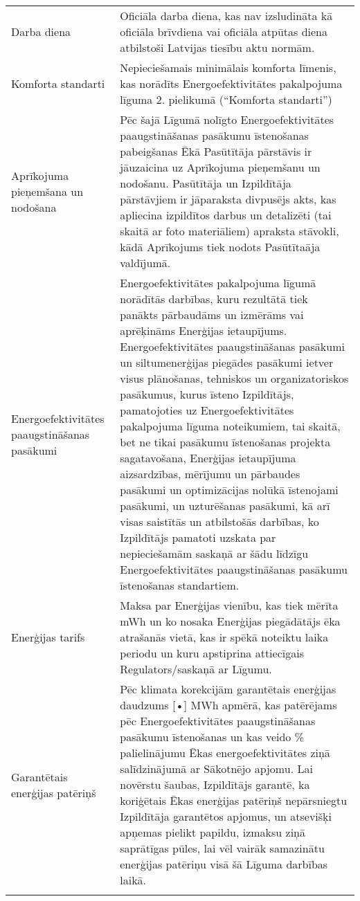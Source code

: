 \documentclass[a4paper]{article}
\begin{document}
\begin{longtabu}{|X|X[2]|}
   \hline

   Darba diena & Oficiāla darba diena, kas nav izsludināta kā oficiāla brīvdiena vai oficiāla atpūtas diena atbilstoši Latvijas tiesību aktu
normām. \\\tabucline{}

   \hline

   Komforta standarti  & Nepieciešamais minimālais komforta līmenis, kas norādīts Energoefektivitātes pakalpojuma līguma 2. pielikumā
(“Komforta standarti”) \\\tabucline{}

   \hline

   Aprīkojuma pieņemšana un
nodošana & Pēc šajā Līgumā nolīgto Energoefektivitātes paaugstināšanas pasākumu īstenošanas pabeigšanas Ēkā Pasūtītāja
pārstāvis ir jāuzaicina uz Aprīkojuma pieņemšanu un nodošanu. Pasūtītāja un Izpildītāja pārstāvjiem ir jāparaksta
divpusējs akts, kas apliecina izpildītos darbus un detalizēti (tai skaitā ar foto materiāliem) apraksta stāvokli, kādā
Aprīkojums tiek nodots Pasūtītaāja valdījumā. \\\tabucline{}

   \hline

   Energoefektivitātes
paaugstināšanas pasākumi & Energoefektivitātes pakalpojuma līgumā norādītās darbības, kuru rezultātā tiek panākts pārbaudāms un izmērāms vai
aprēķināms Enerģijas ietaupījums. Energoefektivitātes paaugstināšanas pasākumi un siltumenerģijas piegādes pasākumi
ietver visus plānošanas, tehniskos un organizatoriskos pasākumus, kurus īsteno Izpildītājs, pamatojoties uz
Energoefektivitātes pakalpojuma līguma noteikumiem, tai skaitā, bet ne tikai pasākumu īstenošanas projekta sagatavošana,
Enerģijas ietaupījuma aizsardzības, mērījumu un pārbaudes pasākumi un optimizācijas nolūkā īstenojami pasākumi, un
uzturēšanas pasākumi, kā arī visas saistītās un atbilstošās darbības, ko Izpildītājs pamatoti uzskata par nepieciešamām
saskaņā ar šādu līdzīgu Energoefektivitātes paaugstināšanas pasākumu īstenošanas standartiem.\\\tabucline{}

   \hline

   Enerģijas tarifs & Maksa par Enerģijas vienību, kas tiek mērīta mWh un ko nosaka Enerģijas piegādātājs ēka atrašanās vietā, kas ir spēkā
noteiktu laika periodu un kuru apstiprina attiecīgais Regulators/saskaņā ar Līgumu.\\\tabucline{}

   \hline

   Garantētais enerģijas patēriņš & Pēc klimata korekcijām garantētais enerģijas daudzums [•] MWh apmērā, kas patērējams pēc Energoefektivitātes
paaugstināšanas pasākumu īstenošanas un kas veido  \% palielinājumu Ēkas energoefektivitātes ziņā salīdzinājumā ar
Sākotnējo apjomu. Lai novērstu šaubas, Izpildītājs garantē, ka koriģētais Ēkas enerģijas patēriņš nepārsniegtu Izpildītāja
garantētos apjomus, un atsevišķi apņemas pielikt papildu, izmaksu ziņā saprātīgas pūles, lai vēl vairāk samazinātu enerģijas
patēriņu visā šā Līguma darbības laikā.\\\tabucline{}


\end{longtabu}
\end{document}
